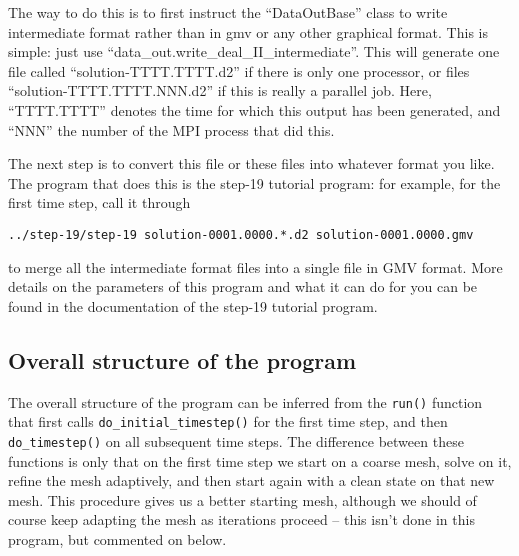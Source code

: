 \documentclass{article}
\begin{document}
The way to do this is to first instruct the ``DataOutBase'' class to
write intermediate format rather than in gmv or any other graphical
format. This is simple: just use
``data\_out.write\_deal\_II\_intermediate''. This will generate one file
called ``solution-TTTT.TTTT.d2'' if there is only one processor, or
files ``solution-TTTT.TTTT.NNN.d2'' if this is really a parallel
job. Here, ``TTTT.TTTT'' denotes the time for which this output has
been generated, and ``NNN'' the number of the MPI process that did this.

The next step is to convert this file or these files into whatever
format you like. The program that does this is the step-19 tutorial program:
for example, for the first time step, call it through
\begin{center}
  \texttt{../step-19/step-19 solution-0001.0000.*.d2 solution-0001.0000.gmv}
\end{center}
to merge all the intermediate format files into a single file in GMV
format. More details on the parameters of this program and what it can do for
you can be found in the documentation of the step-19 tutorial program.



\subsection*{Overall structure of the program}

The overall structure of the program can be inferred from the \texttt{run()}
function that first calls \texttt{do\_initial\_timestep()} for the first time
step, and then \texttt{do\_timestep()} on all subsequent time steps. The
difference between these functions is only that on the first time step we
start on a coarse mesh, solve on it, refine the mesh adaptively, and then
start again with a clean state on that new mesh. This procedure gives us a
better starting mesh, although we should of course keep adapting the mesh as
iterations proceed -- this isn't done in this program, but commented on below.
\end{document}
